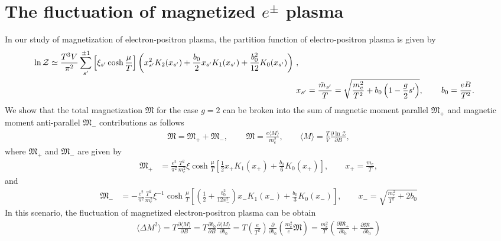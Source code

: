 \documentclass[onecolumn,preprintnumbers,amsmath,amssymb]{revtex4}
\begin{document}
\section{The fluctuation of magnetized $e^\pm$ plasma }
In our study of magnetization of electron-positron plasma, the partition function of electro-positron plasma is given by
\begin{align}
 \begin{split}
 \label{boltzmann}
 \ln{\cal Z}&\simeq\frac{T^{3}V}{\pi^{2}}\sum_{s'}^{\pm1}\left[\xi_{s'}\cosh{\frac{\mu}{T}}\right]\left(x_{s'}^{2}K_{2}(x_{s'})+\frac{b_{0}}{2}x_{s'}K_{1}(x_{s'})+\frac{b_{0}^{2}}{12}K_{0}(x_{s'})\right)\,,
 \end{split}\\
 \label{xfunc}
 x_{s'}&=\frac{{\tilde m}_{s'}}{T}=\sqrt{\frac{m_{e}^{2}}{T^{2}}+b_{0}\left(1-\frac{g}{2}s'\right)},\,\qquad b_0=\frac{eB}{T^2}.
\end{align}
We show that the total magnetization ${\mathfrak M}$  for the case $g=2$ can be broken into the sum of magnetic moment parallel ${\mathfrak M}_{+}$ and magnetic moment anti-parallel ${\mathfrak M}_{-}$ contributions as follows
\begin{align}
\label{g2mag}
{\mathfrak M}={\mathfrak M}_{+}+{\mathfrak M}_{-},\,\qquad {\mathfrak M}=\frac{e\langle M\rangle}{m_e^2},\qquad \langle M\rangle=\frac{T}{V}\frac{\partial \ln{\mathcal Z}}{\partial B},\end{align}
where ${\mathfrak M}_{+}$ and ${\mathfrak M}_{-}$ are given by
\begin{align}
{\mathfrak M}_{+}&=\frac{e^{2}}{\pi^{2}}\frac{T^{2}}{m_{e}^{2}}\xi\cosh{\frac{\mu}{T}}\left[\frac{1}{2}x_{+}K_{1}(x_{+})+\frac{b_{0}}{6}K_{0}(x_{+})\right],\qquad x_{+}=\frac{m_{e}}{T},
\end{align}
and 
\begin{align}
{\mathfrak M}_{-}&=-\frac{e^{2}}{\pi^{2}}\frac{T^{2}}{m_{e}^{2}}\xi^{-1}\cosh{\frac{\mu}{T}}\left[\left(\frac{1}{2}+\frac{b_{0}^{2}}{12x_{-}^{2}}\right)x_{-}K_{1}(x_{-})+\frac{b_{0}}{3}K_{0}(x_{-})\right],  \qquad x_{-}=\sqrt{\frac{m_{e}^{2}}{T^{2}}+2b_{0}}
 \end{align}
 In this scenario, the fluctuation of magnetized electron-positron plasma can be obtain 
 \begin{align}
 \langle\Delta {M}^2\rangle=T\frac{\partial {\langle M\rangle} }{\partial B}=T\frac{\partial b_0}{\partial B}\frac{\partial {\langle M\rangle} }{\partial b_0}=T\left(\frac{e}{T^2}\right)\frac{\partial}{\partial b_0}\left(\frac{m^2_e}{e}{\mathfrak M}\right)=\frac{m_e^2}{T}\left(\frac{\partial {\mathfrak M}_{+} }{\partial b_0}+\frac{\partial {\mathfrak M} _{-}}{\partial b_0}\right)
 \end{align}
\end{document}
